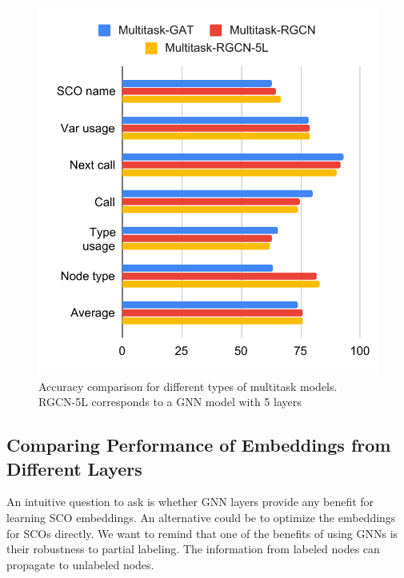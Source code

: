 \documentclass[a4paper,twoside]{article}
\begin{document}

\begin{figure}[]
    \centering
    \includegraphics[width=\columnwidth]{mt_comparison.pdf}
    \caption{Accuracy comparison for different types of multitask models. RGCN-5L corresponds to a GNN model with 5 layers}\label{fig:mt_comparison}
\end{figure}

\subsection{Comparing Performance of Embeddings from Different Layers}

An intuitive question to ask is whether GNN layers provide any benefit for learning SCO embeddings. An alternative could be to optimize the embeddings for SCOs directly. We want to remind that one of the benefits of using GNNs is their robustness to partial labeling. The information from labeled nodes can propagate to unlabeled nodes. 
\end{document}
